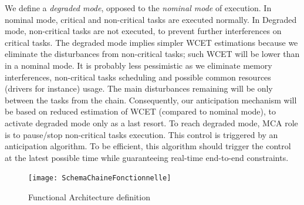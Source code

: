 \documentclass[french, a4paper, 11pt, twoside, pdftex]{StyleThese}
\begin{document}
        We define a \textit{degraded mode}, opposed to the \textit{nominal mode} of execution. In nominal mode, critical and non-critical tasks are executed normally. In Degraded mode, non-critical tasks are not executed, to prevent further interferences on critical tasks. The degraded mode implies simpler WCET estimations because we eliminate the disturbances from non-critical tasks; such WCET will be lower than in a nominal mode. It is probably less pessimistic as we eliminate memory interferences, non-critical tasks scheduling and possible common resources (drivers for instance) usage. The main disturbances remaining will be only between the tasks from the chain. Consequently, our anticipation mechanism will be based on reduced estimation of WCET (compared to nominal mode), to activate degraded mode only as a last resort.
        \smallbreak
        To reach degraded mode, MCA role is to pause/stop non-critical tasks execution. This control is triggered by an anticipation algorithm. To be efficient, this algorithm should trigger the control at the latest possible time while guaranteeing real-time end-to-end constraints.
        
        \begin{figure}[h]
            \centering
            \texttt{[image: SchemaChaineFonctionnelle]}
            \caption{Functional Architecture definition} \label{fig:funcArch}
        \end{figure}
        \smallbreak
\end{document}
